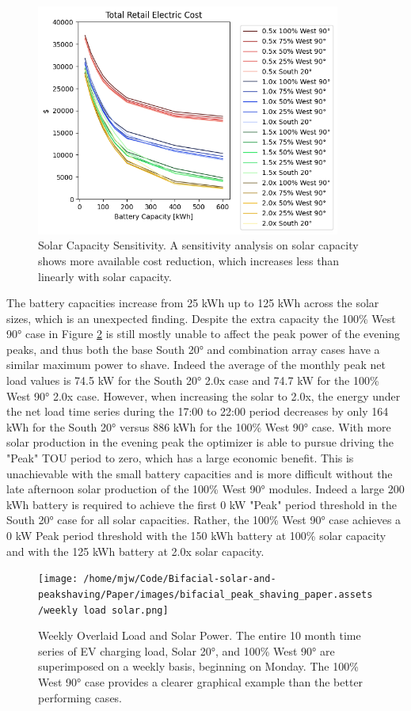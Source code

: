 \documentclass[
]{article}
\begin{document}
\begin{figure}
  \centering
  \includegraphics[width=10cm,height=\textheight]{./images/total cost reduction solar sensitivity.png}
  \caption{Solar Capacity Sensitivity. A sensitivity
  analysis on solar capacity shows more available cost reduction, which
  increases less than linearly with solar capacity.}
  \label{fig:solar-sensitivity}
\end{figure}

The battery capacities increase from 25 kWh up to 125 kWh across the
solar sizes, which is an unexpected finding. Despite the extra capacity
the 100\% West 90° case in Figure \ref{fig:weekly-load-solar} is still mostly unable to affect the
peak power of the evening peaks, and thus both the base South 20° and
combination array cases have a similar maximum power to shave. Indeed
the average of the monthly peak net load values is 74.5 kW for the South
20° 2.0x case and 74.7 kW for the 100\% West 90° 2.0x case. However,
when increasing the solar to 2.0x, the energy under the net load time
series during the 17:00 to 22:00 period decreases by only 164 kWh for
the South 20° versus 886 kWh for the 100\% West 90° case. With more
solar production in the evening peak the optimizer is able to pursue
driving the "Peak" TOU period to zero, which has a large economic
benefit. This is unachievable with the small battery capacities and is
more difficult without the late afternoon solar production of the 100\%
West 90° modules. Indeed a large 200 kWh battery is required to achieve
the first 0 kW "Peak" period threshold in the South 20° case for all
solar capacities. Rather, the 100\% West 90° case achieves a 0 kW Peak
period threshold with the 150 kWh battery at 100\% solar capacity and
with the 125 kWh battery at 2.0x solar capacity.

\begin{figure}
  \centering
  \texttt{[image: /home/mjw/Code/Bifacial-solar-and-peakshaving/Paper/images/bifacial\_peak\_shaving\_paper.assets/weekly load solar.png]}
  \caption{Weekly Overlaid Load and Solar Power. The
  entire 10 month time series of EV charging load, Solar 20°, and 100\%
  West 90° are superimposed on a weekly basis, beginning on Monday. The
  100\% West 90° case provides a clearer graphical example than the better
  performing cases.}
  \label{fig:weekly-load-solar}
\end{figure}
\end{document}
